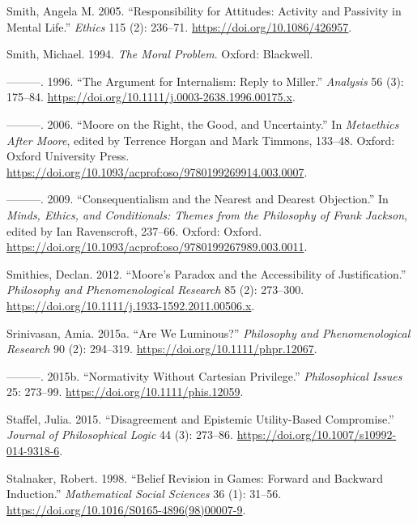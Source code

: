 \documentclass[
  10pt,
  letterpaper,
  twoside]{scrbook}
\newlength{\cslhangindent}
\newenvironment{CSLReferences}[2] %
 {\begin{list}{}{%
  \setlength{\itemindent}{0pt}
  \setlength{\leftmargin}{0pt}
  \setlength{\parsep}{0pt}
  \ifodd #1
   \setlength{\leftmargin}{\cslhangindent}
   \setlength{\itemindent}{-1\cslhangindent}
  \fi
  \setlength{\itemsep}{#2\baselineskip}}}
 {\end{list}}
\begin{document}
\begin{CSLReferences}{1}{0}
Smith, Angela M. 2005. {``Responsibility for Attitudes: Activity and
Passivity in Mental Life.''} \emph{Ethics} 115 (2): 236--71.
\url{https://doi.org/10.1086/426957}.

Smith, Michael. 1994. \emph{The Moral Problem}. Oxford: Blackwell.

---------. 1996. {``The Argument for Internalism: Reply to Miller.''}
\emph{Analysis} 56 (3): 175--84.
\url{https://doi.org/10.1111/j.0003-2638.1996.00175.x}.

---------. 2006. {``Moore on the Right, the Good, and Uncertainty.''} In
\emph{Metaethics After Moore}, edited by Terrence Horgan and Mark
Timmons, 133--48. Oxford: Oxford University Press.
\url{https://doi.org/10.1093/acprof:oso/9780199269914.003.0007}.

---------. 2009. {``Consequentialism and the Nearest and Dearest
Objection.''} In \emph{Minds, Ethics, and Conditionals: Themes from the
Philosophy of Frank Jackson}, edited by Ian Ravenscroft, 237--66.
Oxford: Oxford.
\url{https://doi.org/10.1093/acprof:oso/9780199267989.003.0011}.

Smithies, Declan. 2012. {``Moore's Paradox and the Accessibility of
Justification.''} \emph{Philosophy and Phenomenological Research} 85
(2): 273--300. \url{https://doi.org/10.1111/j.1933-1592.2011.00506.x}.

Srinivasan, Amia. 2015a. {``{A}re {W}e {L}uminous?''} \emph{{P}hilosophy
and {P}henomenological {R}esearch} 90 (2): 294--319.
\url{https://doi.org/10.1111/phpr.12067}.

---------. 2015b. {``Normativity Without Cartesian Privilege.''}
\emph{Philosophical Issues} 25: 273--99.
\url{https://doi.org/10.1111/phis.12059}.

Staffel, Julia. 2015. {``Disagreement and Epistemic Utility-Based
Compromise.''} \emph{Journal of Philosophical Logic} 44 (3): 273--86.
\url{https://doi.org/10.1007/s10992-014-9318-6}.

Stalnaker, Robert. 1998. {``Belief Revision in Games: Forward and
Backward Induction.''} \emph{Mathematical Social Sciences} 36 (1):
31--56. \url{https://doi.org/10.1016/S0165-4896(98)00007-9}.


\end{CSLReferences}
\end{document}

